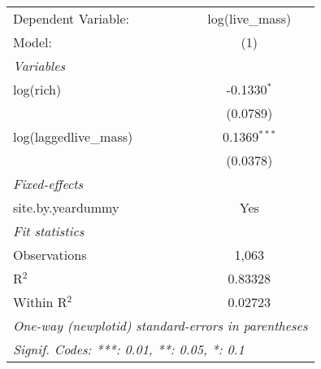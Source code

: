 \begin{tabular}{lc}
\tabularnewline\midrule\midrule
Dependent Variable:&log(live\_mass)\\
Model:&(1)\\
\midrule \emph{Variables}&  \\
log(rich)&-0.1330$^{*}$\\
  &(0.0789)\\
log(laggedlive\_mass)&0.1369$^{***}$\\
  &(0.0378)\\
\midrule \emph{Fixed-effects}&  \\
site.by.yeardummy & Yes\\
\midrule \emph{Fit statistics}&  \\
Observations & 1,063\\
R$^2$ & 0.83328\\
Within R$^2$ & 0.02723\\
\midrule\midrule\multicolumn{2}{l}{\emph{One-way (newplotid) standard-errors in parentheses}}\\
\multicolumn{2}{l}{\emph{Signif. Codes: ***: 0.01, **: 0.05, *: 0.1}}\\
\end{tabular}


